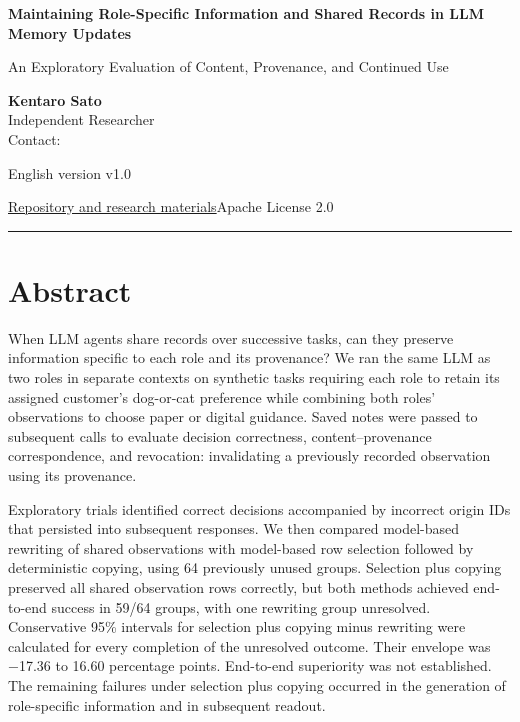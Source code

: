 \documentclass[10pt,a4paper]{article}
\begin{document}
\fontsize{10.7}{15.3}\selectfont\thispagestyle{first}
{\raggedright\sffamily\bfseries\color{ink}\fontsize{22}{27}\selectfont Maintaining Role-Specific Information and Shared Records in LLM Memory Updates\par}

{\raggedright\sffamily\fontsize{13}{17}\selectfont\color{accent} An Exploratory Evaluation of Content, Provenance, and Continued Use\par}

{\small \textbf{Kentaro Sato}\\
Independent Researcher\\
Contact: \texttt{}

English version v1.0\par}
{\small \href{https://github.com/metaSATOKEN/MRSI/tree/9443de315d283874df0c27e0e99b8c04f400709d}{Repository and research materials}\quad\textbar\quad Apache License 2.0\par}\smallskip\hrule\medskip

\section{Abstract}\label{paper-01-abstract}

When LLM agents share records over successive tasks, can they preserve information specific to each role and its provenance? We ran the same LLM as two roles in separate contexts on synthetic tasks requiring each role to retain its assigned customer's dog-or-cat preference while combining both roles' observations to choose paper or digital guidance. Saved notes were passed to subsequent calls to evaluate decision correctness, content--provenance correspondence, and revocation: invalidating a previously recorded observation using its provenance.

Exploratory trials identified correct decisions accompanied by incorrect origin IDs that persisted into subsequent responses. We then compared model-based rewriting of shared observations with model-based row selection followed by deterministic copying, using 64 previously unused groups. Selection plus copying preserved all shared observation rows correctly, but both methods achieved end-to-end success in 59/64 groups, with one rewriting group unresolved. Conservative 95\% intervals for selection plus copying minus rewriting were calculated for every completion of the unresolved outcome. Their envelope was −17.36 to 16.60 percentage points. End-to-end superiority was not established. The remaining failures under selection plus copying occurred in the generation of role-specific information and in subsequent readout.
\end{document}
